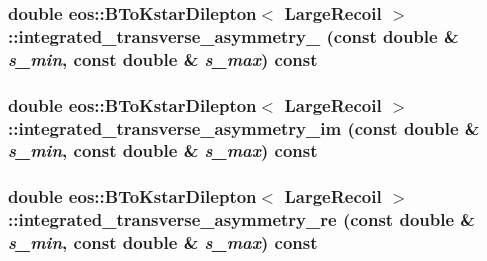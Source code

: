 \label{classeos_1_1BToKstarDilepton_3_01LargeRecoil_01_4_a745412c6ccdb663f905f06be923082f2}
\hypertarget{classeos_1_1BToKstarDilepton_3_01LargeRecoil_01_4_aff2ff1bed79cb777349b6e9bdf20cd66}{
\subsubsection[{integrated\_\-transverse\_\-asymmetry\_\-5}]{\setlength{\rightskip}{0pt plus 5cm}double eos::BToKstarDilepton$<$ {\bf LargeRecoil} $>$::integrated\_\-transverse\_\-asymmetry\_ (const double \& {\em s\_\-min}, \/  const double \& {\em s\_\-max}) const}}
\label{classeos_1_1BToKstarDilepton_3_01LargeRecoil_01_4_aff2ff1bed79cb777349b6e9bdf20cd66}
\hypertarget{classeos_1_1BToKstarDilepton_3_01LargeRecoil_01_4_a2e38ce6db1732ee1452203414b9c7280}{
\subsubsection[{integrated\_\-transverse\_\-asymmetry\_\-im}]{\setlength{\rightskip}{0pt plus 5cm}double eos::BToKstarDilepton$<$ {\bf LargeRecoil} $>$::integrated\_\-transverse\_\-asymmetry\_\-im (const double \& {\em s\_\-min}, \/  const double \& {\em s\_\-max}) const}}
\label{classeos_1_1BToKstarDilepton_3_01LargeRecoil_01_4_a2e38ce6db1732ee1452203414b9c7280}
\hypertarget{classeos_1_1BToKstarDilepton_3_01LargeRecoil_01_4_a535ddfbdc0000407bd98814504308556}{
\subsubsection[{integrated\_\-transverse\_\-asymmetry\_\-re}]{\setlength{\rightskip}{0pt plus 5cm}double eos::BToKstarDilepton$<$ {\bf LargeRecoil} $>$::integrated\_\-transverse\_\-asymmetry\_\-re (const double \& {\em s\_\-min}, \/  const double \& {\em s\_\-max}) const}}
